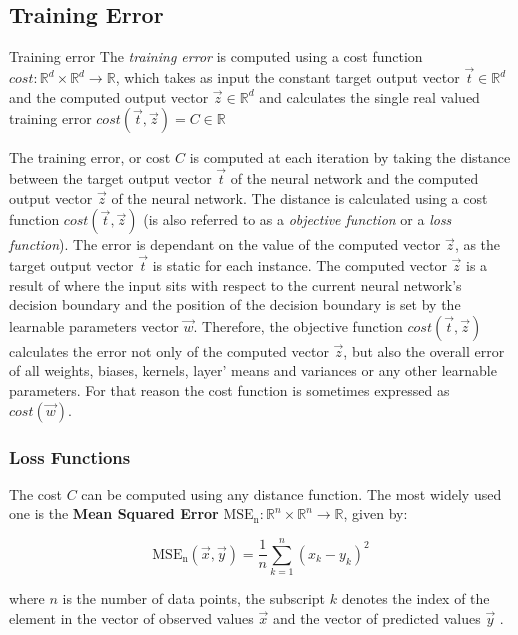 \subsection{Training Error}
\begin{Definition}{Training error}{}
The \emph{training error} is computed using a cost function $cost: \mathbb{R}^d \times \mathbb{R}^d \to \mathbb{R}$, which takes as input the constant target output vector $\vec{t} \in \mathbb{R}^d$ and the computed output vector $\vec{z}\in \mathbb{R}^d$ and calculates the single real valued training error $cost(\vec{t},\vec{z})= C \in \mathbb{R}$
\end{Definition}

The training error, or cost $C$ is computed at each iteration by taking the distance between the target output vector $\vec{t}$ of the neural network and the computed output vector $\vec{z}$ of the neural network. The distance is calculated using a cost function $cost(\vec{t}, \vec{z})$ (is also referred to as a \textit{objective function} or a \textit{loss function}). The error is dependant on the value of the computed vector $\vec{z}$, as the target output vector $\vec{t}$ is static for each instance. The computed vector $\vec{z}$ is a result of where the input sits with respect to the current neural network's decision boundary and the position of the decision boundary is set by the learnable parameters vector $\vec{w}$. Therefore, the objective function $cost(\vec{t}, \vec{z})$ calculates the error not only of the computed vector $\vec{z}$, but also the overall error of all weights, biases, kernels, layer’ means and variances or any other learnable parameters. For that reason the cost function is sometimes expressed as $cost(\vec{w})$.

\subsubsection{Loss Functions}
The cost $C$ can be computed using any distance function. The most widely used one is the \textbf{Mean Squared Error} $\mathrm{MSE_n}: \mathbb{R}^n \times \mathbb{R}^n \to \mathbb{R}$, given by: 

\begin{equation*}
\mathrm{MSE_n}(\vec{x}, \vec{y})= \frac{1}{n} \sum_{k=1}^{n}\left(x_k-y_k\right)^{2} 
\end{equation*}


where $n$ is the number of data points, the subscript $k$ denotes the index of the element in the vector of observed values $\vec{x}$ and the vector of predicted values $\vec{y}$ . 


